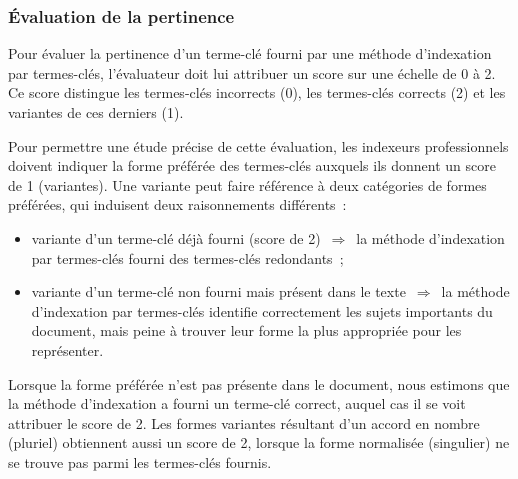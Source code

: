       \subsubsection{Évaluation de la pertinence}
      \label{subsubsec:main-automatic_evaluation_of_keyphrase_annotation-methodology-evaluation_protocol-relevancy}
        Pour évaluer la pertinence d'un terme-clé fourni par une méthode
        d'indexation par termes-clés, l'évaluateur doit lui attribuer un score
        sur une échelle de 0 à 2. Ce score distingue les termes-clés incorrects
        (0), les termes-clés corrects (2) et les variantes de ces derniers (1).

        Pour permettre une étude précise de cette évaluation, les indexeurs
        professionnels doivent indiquer la forme préférée des termes-clés
        auxquels ils donnent un score de 1 (variantes). Une variante peut faire
        référence à deux catégories de formes préférées, qui induisent deux
        raisonnements différents~:
        \begin{itemize}
          \item{variante d'un terme-clé déjà fourni (score de
                2)~$\Rightarrow$~la méthode d'indexation par termes-clés fourni
                des termes-clés redondants~;}
          \item{variante d'un terme-clé non fourni mais présent dans le
              texte~$\Rightarrow$~la méthode d'indexation par termes-clés
                identifie correctement les sujets importants du document, mais
                peine à trouver leur forme la plus appropriée pour les
                représenter.}
        \end{itemize}

        Lorsque la forme préférée n'est pas présente dans le document, nous
        estimons que la méthode d'indexation a fourni un terme-clé correct,
        auquel cas il se voit attribuer le score de 2. Les formes variantes
        résultant d'un accord en nombre (pluriel) obtiennent aussi un score de
        2, lorsque la forme normalisée (singulier) ne se trouve pas parmi les
        termes-clés fournis.

